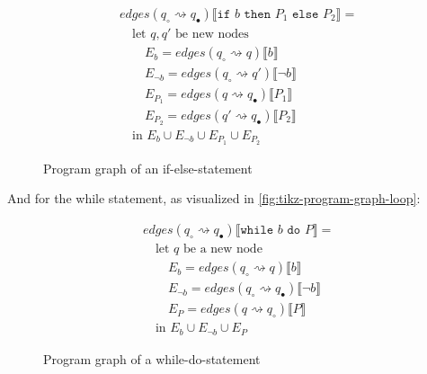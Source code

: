 \begin{equation}
    \begin{split}
        &edges(q_\circ \rightsquigarrow q_\bullet) \lBrack \texttt{if } b \texttt{ then } P_1 \texttt{ else } P_2 \rBrack = \\
        &\quad \text{let } q, q' \text{ be new nodes} \\
        &\quad\quad E_{b} = edges(q_\circ \rightsquigarrow q) \lBrack b \rBrack \\
        &\quad\quad E_{\neg b} = edges(q_\circ \rightsquigarrow q') \lBrack \neg b \rBrack \\
        &\quad\quad E_{P_1}= edges(q \rightsquigarrow q_\bullet) \lBrack P_1 \rBrack \\
        &\quad\quad E_{P_2}= edges(q' \rightsquigarrow q_\bullet) \lBrack P_2 \rBrack \\
        &\quad \text{in } E_{b} \cup E_{\neg b} \cup E_{P_1} \cup E_{P_2}
    \end{split}\label{eq:equation8}
\end{equation}

\begin{figure}[htb!]
    \center
    
    \caption{Program graph of an if-else-statement}
    \label{fig:tikz-program-graph-if}
\end{figure}

And for the while statement, as visualized in \autoref{fig:tikz-program-graph-loop}:

\begin{equation}
    \begin{split}
        &edges(q_\circ \rightsquigarrow q_\bullet) \lBrack \texttt{while } b \texttt{ do } P \rBrack = \\
        &\quad \text{let } q \text{ be a new node} \\
        &\quad\quad E_{b} = edges(q_\circ \rightsquigarrow q) \lBrack b \rBrack \\
        &\quad\quad E_{\neg b} = edges(q_\circ \rightsquigarrow q_\bullet) \lBrack \neg b \rBrack \\
        &\quad\quad E_{P} = edges(q \rightsquigarrow q_\circ) \lBrack P \rBrack \\
        &\quad \text{in } E_{b} \cup E_{\neg b} \cup E_{P}
    \end{split}\label{eq:equation9}
\end{equation}

\begin{figure}[htb!]
    \center
    
    \caption{Program graph of a while-do-statement}
    \label{fig:tikz-program-graph-loop}
\end{figure}

